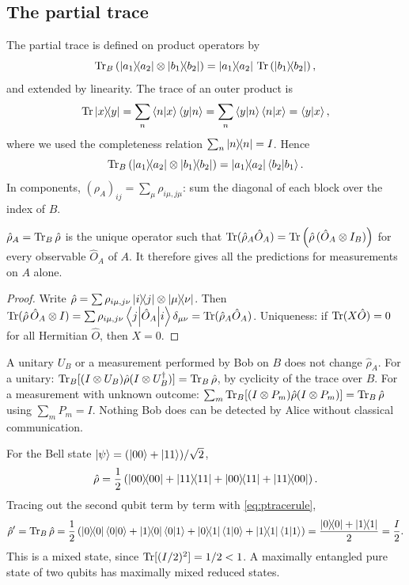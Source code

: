 \subsection{The partial trace}
The partial trace is defined on product operators by
\begin{equation}
  \tr_B\left(\ketbra{a_1}{a_2}\otimes\ketbra{b_1}{b_2}\right)=\ketbra{a_1}{a_2}\,\tr\left(\ketbra{b_1}{b_2}\right),
\end{equation}
and extended by linearity. The trace of an outer product is
\begin{equation}
  \tr\ketbra xy=\sum_n\braket nx\braket yn=\sum_n\braket yn\braket nx=\braket yx,
\end{equation}
where we used the completeness relation $\sum_n\proj n=I$. Hence
\begin{equation}\label{eq:ptracerule}
  \tr_B\left(\ketbra{a_1}{a_2}\otimes\ketbra{b_1}{b_2}\right)=\ketbra{a_1}{a_2}\braket{b_2}{b_1}.
\end{equation}
In components, $(\rho_A)_{ij}=\sum_\mu\rho_{i\mu,j\mu}$: sum the diagonal of each block over the index of $B$.

\begin{proposition}
$\hat\rho_A=\tr_B\hat\rho$ is the unique operator such that $\tr(\hat\rho_A\hat O_A)=\tr\left(\hat\rho\,(\hat O_A\otimes I_B)\right)$ for every observable $\hat O_A$ of $A$.
It therefore gives all the predictions for measurements on $A$ alone.
\end{proposition}
\begin{proof}
Write $\hat\rho=\sum\rho_{i\mu,j\nu}\ketbra ij\otimes\ketbra\mu\nu$. Then $\tr(\hat\rho\,\hat O_A\otimes I)=\sum\rho_{i\mu,j\nu}\mel j{\hat O_A}i\delta_{\mu\nu}=\tr(\hat\rho_A\hat O_A)$.
Uniqueness: if $\tr(X\hat O)=0$ for all Hermitian $\hat O$, then $X=0$.
\end{proof}
\begin{corollary}[No signalling]
A unitary $U_B$ or a measurement performed by Bob on $B$ does not change $\hat\rho_A$. For a unitary: $\tr_B[(I\otimes U_B)\hat\rho(I\otimes U_B^\dagger)]=\tr_B\hat\rho$, by
cyclicity of the trace over $B$. For a measurement with unknown outcome: $\sum_m\tr_B[(I\otimes P_m)\hat\rho(I\otimes P_m)]=\tr_B\hat\rho$ using $\sum_mP_m=I$.
Nothing Bob does can be detected by Alice without classical communication.
\end{corollary}

\begin{example}
For the Bell state $\ket\psi=(\ket{00}+\ket{11})/\sqrt2$,
\begin{equation}
  \hat\rho=\frac12\left(\ketbra{00}{00}+\ketbra{11}{11}+\ketbra{00}{11}+\ketbra{11}{00}\right).
\end{equation}
Tracing out the second qubit term by term with \cref{eq:ptracerule},
\begin{equation}
  \hat\rho'=\tr_B\hat\rho=\frac12\left(\proj0\braket00+\ketbra10\braket01+\ketbra01\braket10+\proj1\braket11\right)=\frac{\proj0+\proj1}2=\frac I2.
\end{equation}
This is a mixed state, since $\tr[(I/2)^2]=1/2<1$. A maximally entangled pure state of two qubits has maximally mixed reduced states.
\end{example}

